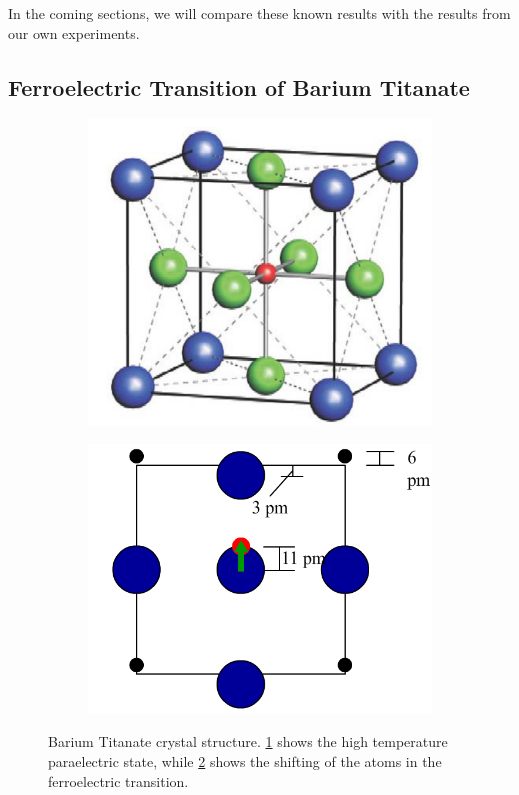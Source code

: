 \documentclass[%
 reprint,
 amsmath,amssymb,
 aps,
 pra,
]{revtex4-1}
\begin{document}
\noindent In the coming sections, we will compare these known results with the results from our own experiments.

\subsection{Ferroelectric Transition of Barium Titanate}

\begin{figure}[H]
	\centering
	\begin{subfigure}{0.22\textwidth}
		\includegraphics[width=1\textwidth]{barium_cubic.png}
		\caption{}
		\label{fig:barium:cubic}
	\end{subfigure}
	\begin{subfigure}{0.24\textwidth}
		\includegraphics[width=\textwidth]{barium_transition_numbers.png} 
		\caption{}
		\label{fig:barium:transition}
	\end{subfigure}
	\caption{Barium Titanate crystal structure. \ref{fig:barium:cubic} shows the high temperature paraelectric state, while \ref{fig:barium:transition} shows the shifting of the atoms in the ferroelectric transition.}
	\label{fig:barium}
\end{figure}
\end{document}

